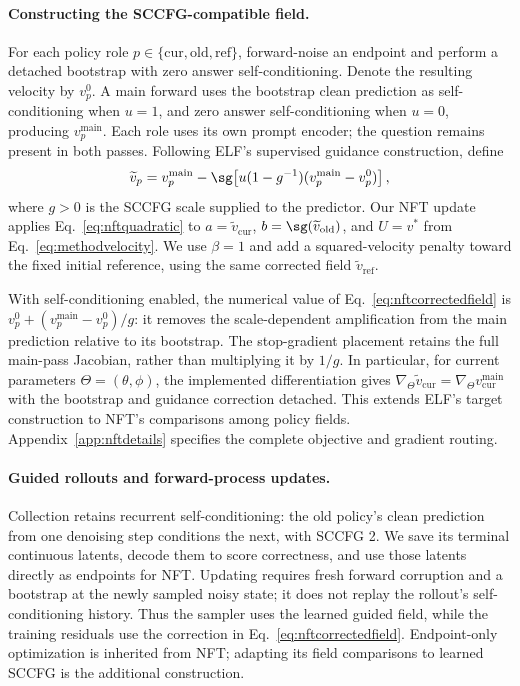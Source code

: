 \paragraph{Constructing the SCCFG-compatible field.}
For each policy role $p\in\{\mathrm{cur},\mathrm{old},\mathrm{ref}\}$, forward-noise an endpoint and perform a detached bootstrap with zero answer self-conditioning. Denote the resulting velocity by $v_p^0$. A main forward uses the bootstrap clean prediction as self-conditioning when $u=1$, and zero answer self-conditioning when $u=0$, producing $v_p^{\mathrm{main}}$. Each role uses its own prompt encoder; the question remains present in both passes. Following ELF's supervised guidance construction, define
\begin{equation}
 \widetilde v_p=v_p^{\mathrm{main}}-
 \sg\!\left[u(1-g^{-1})(v_p^{\mathrm{main}}-v_p^0)\right],
 \label{eq:nftcorrectedfield}
\end{equation}
where $g>0$ is the SCCFG scale supplied to the predictor. Our NFT update applies Eq.~\eqref{eq:nftquadratic} to $a=\widetilde v_{\mathrm{cur}}$, $b=\sg(\widetilde v_{\mathrm{old}})$, and $U=v^*$ from Eq.~\eqref{eq:methodvelocity}. We use $\beta=1$ and add a squared-velocity penalty toward the fixed initial reference, using the same corrected field $\widetilde v_{\mathrm{ref}}$.

With self-conditioning enabled, the numerical value of Eq.~\eqref{eq:nftcorrectedfield} is $v_p^0+(v_p^{\mathrm{main}}-v_p^0)/g$: it removes the scale-dependent amplification from the main prediction relative to its bootstrap. The stop-gradient placement retains the full main-pass Jacobian, rather than multiplying it by $1/g$. In particular, for current parameters $\Theta=(\theta,\phi)$, the implemented differentiation gives $\nabla_\Theta\widetilde v_{\mathrm{cur}}=\nabla_\Theta v_{\mathrm{cur}}^{\mathrm{main}}$ with the bootstrap and guidance correction detached. This extends ELF's target construction to NFT's comparisons among policy fields. Appendix~\ref{app:nftdetails} specifies the complete objective and gradient routing.

\paragraph{Guided rollouts and forward-process updates.}
Collection retains recurrent self-conditioning: the old policy's clean prediction from one denoising step conditions the next, with SCCFG 2. We save its terminal continuous latents, decode them to score correctness, and use those latents directly as endpoints for NFT. Updating requires fresh forward corruption and a bootstrap at the newly sampled noisy state; it does not replay the rollout's self-conditioning history. Thus the sampler uses the learned guided field, while the training residuals use the correction in Eq.~\eqref{eq:nftcorrectedfield}. Endpoint-only optimization is inherited from NFT; adapting its field comparisons to learned SCCFG is the additional construction.

